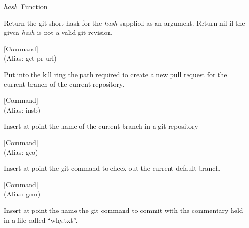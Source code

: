 \vspace{1em}
\noindent
{}
\usebox{\funcname}\emph{hash}
 \hfill [Function]

\begin{doc-string}
Return the git short hash for the \emph{hash} supplied as an argument.  Return nil
if the given \emph{hash} is not a valid git revision.
\end{doc-string}

\vspace{1em}
\noindent
{}
\usebox{\funcname}
 \hfill [Command]\\%
 (Alias: get-pr-url)

\begin{doc-string}
Put into the kill ring the path required to create a new pull request for
the current branch of the current repository.
\end{doc-string}

\vspace{1em}
\noindent
{}
\usebox{\funcname}
 \hfill [Command]\\%
 (Alias: insb)

\begin{doc-string}
Insert at point the name of the current branch in a git repository
\end{doc-string}

\vspace{1em}
\noindent
{}
\usebox{\funcname}
 \hfill [Command]\\%
 (Alias: gco)

\begin{doc-string}
Insert at point the git command to check out the current default branch.
\end{doc-string}

\vspace{1em}
\noindent
{}
\usebox{\funcname}
 \hfill [Command]\\%
 (Alias: gcm)

\begin{doc-string}
Insert at point the name the git command to commit with the commentary held
in a file called ``why.txt''.
\end{doc-string}

